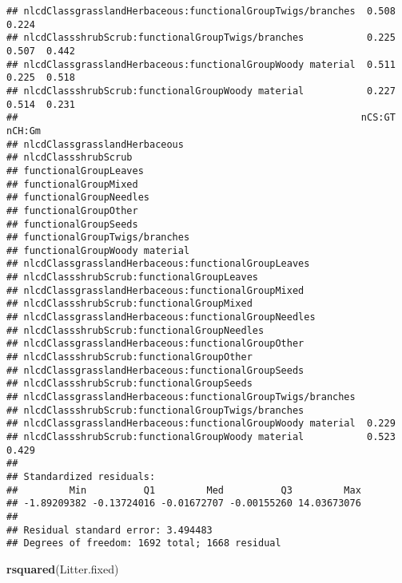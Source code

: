 \documentclass[]{article}
\newenvironment{Shaded}{\begin{snugshade}}{\end{snugshade}}
\newcommand{\KeywordTok}[1]{\textcolor[rgb]{0.13,0.29,0.53}{\textbf{#1}}}
\newcommand{\NormalTok}[1]{#1}
\begin{document}
\begin{verbatim}
## nlcdClassgrasslandHerbaceous:functionalGroupTwigs/branches  0.508  0.224       
## nlcdClassshrubScrub:functionalGroupTwigs/branches           0.225  0.507  0.442
## nlcdClassgrasslandHerbaceous:functionalGroupWoody material  0.511  0.225  0.518
## nlcdClassshrubScrub:functionalGroupWoody material           0.227  0.514  0.231
##                                                            nCS:GT nCH:Gm
## nlcdClassgrasslandHerbaceous                                            
## nlcdClassshrubScrub                                                     
## functionalGroupLeaves                                                   
## functionalGroupMixed                                                    
## functionalGroupNeedles                                                  
## functionalGroupOther                                                    
## functionalGroupSeeds                                                    
## functionalGroupTwigs/branches                                           
## functionalGroupWoody material                                           
## nlcdClassgrasslandHerbaceous:functionalGroupLeaves                      
## nlcdClassshrubScrub:functionalGroupLeaves                               
## nlcdClassgrasslandHerbaceous:functionalGroupMixed                       
## nlcdClassshrubScrub:functionalGroupMixed                                
## nlcdClassgrasslandHerbaceous:functionalGroupNeedles                     
## nlcdClassshrubScrub:functionalGroupNeedles                              
## nlcdClassgrasslandHerbaceous:functionalGroupOther                       
## nlcdClassshrubScrub:functionalGroupOther                                
## nlcdClassgrasslandHerbaceous:functionalGroupSeeds                       
## nlcdClassshrubScrub:functionalGroupSeeds                                
## nlcdClassgrasslandHerbaceous:functionalGroupTwigs/branches              
## nlcdClassshrubScrub:functionalGroupTwigs/branches                       
## nlcdClassgrasslandHerbaceous:functionalGroupWoody material  0.229       
## nlcdClassshrubScrub:functionalGroupWoody material           0.523  0.429
## 
## Standardized residuals:
##         Min          Q1         Med          Q3         Max 
## -1.89209382 -0.13724016 -0.01672707 -0.00155260 14.03673076 
## 
## Residual standard error: 3.494483 
## Degrees of freedom: 1692 total; 1668 residual
\end{verbatim}

\begin{Shaded}
\begin{Highlighting}[]
\KeywordTok{rsquared}\NormalTok{(Litter.fixed)}
\end{Highlighting}
\end{Shaded}
\end{document}
